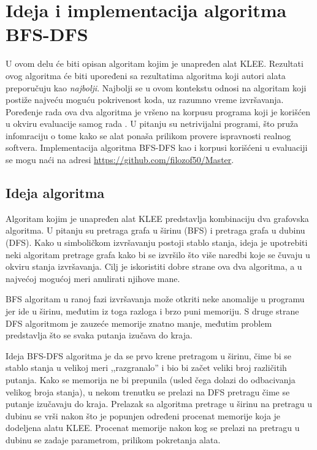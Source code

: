 \documentclass[12pt,oneside]{memoir}
\begin{document}
\chapter{Ideja i implementacija algoritma BFS-DFS} \label{algoritam}
U ovom delu će biti opisan algoritam kojim je unapređen alat KLEE. Rezultati ovog algoritma će biti upoređeni sa rezultatima algoritma koji autori alata preporučuju kao \textit{najbolji}. Najbolji se u ovom kontekstu odnosi na algoritam koji postiže najveću moguću pokrivenost koda, uz razumno vreme izvršavanja. Poređenje rada ova dva algoritma je vršeno na korpusu programa koji je korišćen u okviru evaluacije samog rada \cite{klee}. U pitanju su netrivijalni programi, što pruža infomraciju o tome kako se alat ponaša prilikom provere ispravnosti realnog softvera. Implementacija algoritma BFS-DFS kao i korpusi korišćeni u evaluaciji se mogu naći na adresi \url{https://github.com/filozof50/Master}.

\section{Ideja algoritma} \label{ideja_algoritma}
Algoritam kojim je unapređen alat KLEE predstavlja kombinaciju dva grafovska algoritma. U pitanju su pretraga grafa u širinu (BFS) i pretraga grafa u dubinu (DFS). Kako u simboličkom izvršavanju postoji stablo stanja, ideja je upotrebiti neki algoritam pretrage grafa kako bi se izvršilo što više naredbi koje se čuvaju u okviru stanja izvršavanja. Cilj je iskoristiti dobre strane ova dva algoritma, a u najvećoj mogućoj meri anulirati njihove mane. 

BFS algoritam u ranoj fazi izvršavanja može otkriti neke anomalije u programu jer ide u širinu, međutim iz toga razloga i brzo puni memoriju. S druge strane DFS algoritmom je zauzeće memorije znatno manje, međutim problem predstavlja što se svaka putanja izučava do kraja. 

Ideja BFS-DFS algoritma je da se prvo krene pretragom u širinu, čime bi se stablo stanja u velikoj meri ,,razgranalo'' i bio bi začet veliki broj različitih putanja. Kako se memorija ne bi prepunila (usled čega dolazi do odbacivanja velikog broja stanja), u nekom trenutku se prelazi na DFS pretragu čime se putanje izučavaju do kraja. Prelazak sa algoritma pretrage u širinu na pretragu u dubinu se vrši nakon što je popunjen određeni procenat memorije koja je dodeljena alatu KLEE. Procenat memorije nakon kog se prelazi na pretragu u dubinu se zadaje parametrom, prilikom pokretanja alata. 
\end{document}
